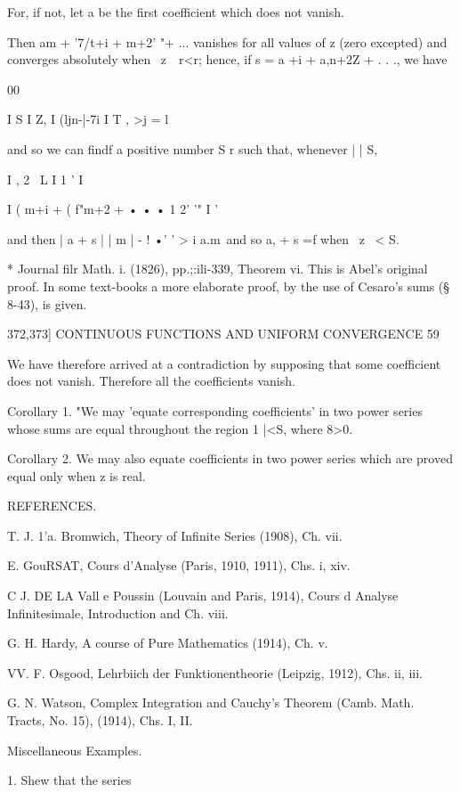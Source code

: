 For, if not, let a be the first coefficient which does not vanish.

Then am + '7/t+i + m+2' "+ ... vanishes for all values of z (zero
excepted) and converges absolutely when \ z\ \ r<r; hence, if s = a
+i + a,n+2Z + . . ., we have

00

I S I Z, I (ljn-|-7i I T , >j = l

and so we can findf a positive number S r such that, whenever | | S,

I , 2 \ L I 1 ' I

I ( m+i + ( f"m+2 + • • • 1 2' '" I '

and then | a + s | | m | - ! •' ' > i a.m\, and so a, + s =f when \ z
\ < S.

* Journal filr Math. i. (1826), pp.;:ili-339, Theorem vi. This is
Abel's original proof. In some text-books a more elaborate proof, by
the use of Cesaro's sums (§ 8-43), is given.



372,373] CONTINUOUS FUNCTIONS AND UNIFORM CONVERGENCE 59

We have therefore arrived at a contradiction by supposing that some
coefficient does not vanish. Therefore all the coefficients vanish.

Corollary 1. "We may 'equate corresponding coefficients' in two power
series whose sums are equal throughout the region 1 |<S, where 8>0.

Corollary 2. We may also equate coefficients in two power series which
are proved equal only when z is real.



REFERENCES.

T. J. 1'a. Bromwich, Theory of Infinite Series (1908), Ch. vii.

E. GouRSAT, Cours d'Analyse (Paris, 1910, 1911), Chs. i, xiv.

C J. DE LA Vall e Poussin (Louvain and Paris, 1914), Cours d Analyse
Infinitesimale, Introduction and Ch. viii.

G. H. Hardy, A course of Pure Mathematics (1914), Ch. v.

VV. F. Osgood, Lehrbiich der Funktionentheorie (Leipzig, 1912), Chs.
ii, iii.

G. N. Watson, Complex Integration and Cauchy's Theorem (Camb. Math.
Tracts, No. 15), (1914), Chs. I, II.



Miscellaneous Examples.

1. Shew that the series



